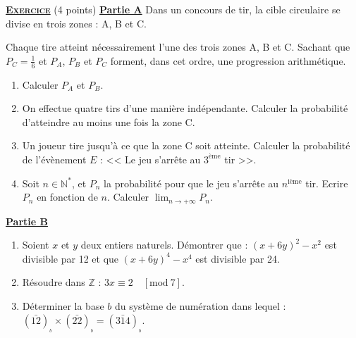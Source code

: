\providecommand{\dx}{\mathrm{d}x}

\noindent \underline{\textsc{\textbf{Exercice}}} (4 points) \newline
%
      \noindent \underline{\textbf{Partie A}}
            Dans un concours de tir, la cible circulaire se divise en trois zones : A, B et C.
            \begin{figure}[h]
            \centering
            \end{figure}
            Chaque tire atteint n\'ecessairement l'une des trois zones A, B et C.
            Sachant que $P_C = \frac{1}{6}$ et $P_A$, $P_B$ et $P_C$ forment, dans cet ordre, une progression arithm\'etique.
            \begin{enumerate}
                  \item Calculer $P_A$ et $P_B$.
                  \item On effectue quatre tirs d'une mani\`ere ind\'ependante. Calculer la probabilit\'e d'atteindre au moins une fois la zone C.
                  \item Un joueur tire jusqu'\`a ce que la zone C soit atteinte.
                        Calculer la probabilit\'e de l'\'ev\`enement $E$ : << Le jeu s'arr\^ete au $\text{3}^\text{\`eme}$ tir >>.
                  \item Soit $n\in\mathbb{N}^*$, et $P_n$ la probabilit\'e pour que le jeu s'arr\^ete au $n^\text{i\`eme}$ tir.
                        Ecrire $P_n$ en fonction de $n$.
                        Calculer $\lim_{n\rightarrow+\infty} P_n$.
            \end{enumerate}
      \noindent \underline{\textbf{Partie B}}
            \begin{enumerate}
                  \item Soient $x$ et $y$ deux entiers naturels.
                        D\'emontrer que : $(x+6y)^2 - x^2$ est divisible par 12 et que $(x+6y)^4 - x^4$ est divisible par 24.
                  \item R\'esoudre dans $\mathbb{Z}$ : $3x \equiv 2 \quad [\mathrm{mod}\ 7]$.
                  \item D\'eterminer la base $b$ du syst\`eme de num\'eration dans lequel : $(\bar{12})_{_b} \times (\bar{22})_{_b} = (\bar{314})_{_b}$.
            \end{enumerate}

